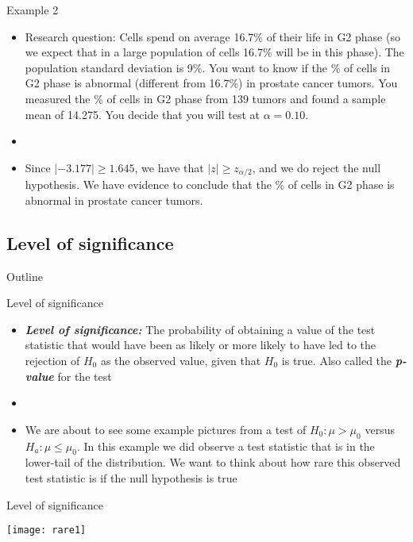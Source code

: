 \documentclass[xcolor=dvipsnames]{beamer}
\begin{document}
\begin{frame}{Example 2}
	\begin{itemize}
		\item Research question: Cells spend on average 16.7\% of their life in G2 phase (so we expect that in a large population of cells 16.7\% will be in this phase). The population standard deviation is 9\%. You want to know if the \% of cells in G2 phase is abnormal (different from 16.7\%) in prostate cancer tumors. You measured the \% of cells in G2 phase from 139 tumors and found a sample mean of 14.275. You decide that you will test at $\alpha = 0.10$.
		
		\item[]
		
		\item Since $|-3.177| \geq 1.645$, we have that $|z| \geq z_{\alpha / 2}$, and we do reject the null hypothesis. We have evidence to conclude that the \% of cells in G2 phase is abnormal in prostate cancer tumors. 
	\end{itemize}
\end{frame}

\subsection{Level of significance}
\begin{frame}{Outline}
\tableofcontents[currentsection,subsectionstyle=show/shaded/hide]
\end{frame}

\begin{frame}{Level of significance}
	\begin{itemize}
		\item \textbf{\emph{Level of significance:}} The probability of obtaining a value of the test statistic that would have been as likely or more likely to have led to the rejection of $H_0$ as the observed value, given that $H_0$ is true. Also called the \textbf{\emph{p-value}} for the test  \pause
		\item[]
		\item We are about to see some example pictures from a test of $H_0: \mu > \mu_0$ versus $H_a: \mu \leq \mu_0$. In this example we did observe a test statistic that is in the lower-tail of the distribution. We want to think about how rare this observed test statistic is if the null hypothesis is true
	\end{itemize}
\end{frame}

\begin{frame}{Level of significance}
	\begin{center}
		\texttt{[image: rare1]}
	\end{center}
\end{frame}
\end{document}
